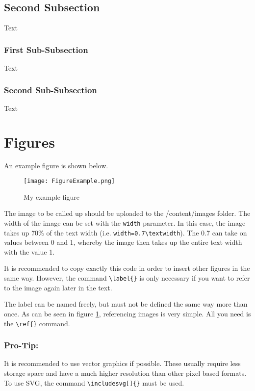 \subsection{Second Subsection}
Text

\subsubsection{First Sub-Subsection}
Text

\subsubsection{Second Sub-Subsection}
Text


\section{Figures}
An example figure is shown below.

\begin{figure}[H]
    \centering
    \texttt{[image: FigureExample.png]}
    \caption{My example figure}
    \label{fig:example}
\end{figure}

The image to be called up should be uploaded to the /content/images folder. The width of the image can be set with the \texttt{width} parameter. In this case, the image takes up 70\% of the text width (i.e. \texttt{width=0.7\textbackslash{}textwidth}). The 0.7 can take on values between 0 and 1, whereby the image then takes up the entire text width with the value 1.

It is recommended to copy exactly this code in order to insert other figures in the same way. However, the command \texttt{\textbackslash{}label\{\}} is only necessary if you want to refer to the image again later in the text.

The label can be named freely, but must not be defined the same way more than once. As can be seen in figure \ref{fig:example}, referencing images is very simple. All you need is the \texttt{\textbackslash{}ref\{\}} command.

\subsubsection{Pro-Tip:}
It is recommended to use vector graphics if possible. These usually require less storage space and have a much higher resolution than other pixel based formats. To use SVG, the command \texttt{\textbackslash{}includesvg[]\{\}} must be used.



